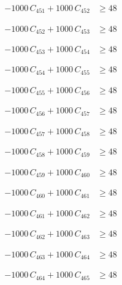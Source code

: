 \documentclass[a4paper,11pt]{article}
\begin{document}
\begin{align}
-1000\,C_{451} + 1000\,C_{452} &\geq 48 \nonumber
\end{align}

\begin{align}
-1000\,C_{452} + 1000\,C_{453} &\geq 48 \nonumber
\end{align}

\begin{align}
-1000\,C_{453} + 1000\,C_{454} &\geq 48 \nonumber
\end{align}

\begin{align}
-1000\,C_{454} + 1000\,C_{455} &\geq 48 \nonumber
\end{align}

\begin{align}
-1000\,C_{455} + 1000\,C_{456} &\geq 48 \nonumber
\end{align}

\begin{align}
-1000\,C_{456} + 1000\,C_{457} &\geq 48 \nonumber
\end{align}

\begin{align}
-1000\,C_{457} + 1000\,C_{458} &\geq 48 \nonumber
\end{align}

\begin{align}
-1000\,C_{458} + 1000\,C_{459} &\geq 48 \nonumber
\end{align}

\begin{align}
-1000\,C_{459} + 1000\,C_{460} &\geq 48 \nonumber
\end{align}

\begin{align}
-1000\,C_{460} + 1000\,C_{461} &\geq 48 \nonumber
\end{align}

\begin{align}
-1000\,C_{461} + 1000\,C_{462} &\geq 48 \nonumber
\end{align}

\begin{align}
-1000\,C_{462} + 1000\,C_{463} &\geq 48 \nonumber
\end{align}

\begin{align}
-1000\,C_{463} + 1000\,C_{464} &\geq 48 \nonumber
\end{align}

\begin{align}
-1000\,C_{464} + 1000\,C_{465} &\geq 48 \nonumber
\end{align}
\end{document}
